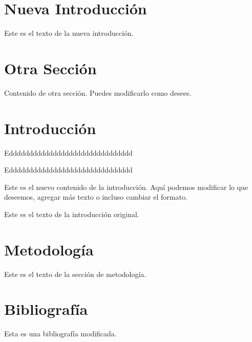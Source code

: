 \documentclass{article}%
\begin{document}
%
\normalsize%
\section{Nueva Introducción}%
\label{sec:NuevaIntroduccin}%
Este es el texto de la nueva introducción.

%
\section{Otra Sección}%
\label{sec:OtraSeccin}%
Contenido de otra sección. Puedes modificarlo como desees.





\section{Introducción}
Eddddddddddddddddddddddddddddddd

Eddddddddddddddddddddddddddddddd

Este es el nuevo contenido de la introducción. Aquí podemos modificar lo que deseemos, 
agregar más texto o incluso cambiar el formato.

Este es el texto de la introducción original.

\section{Metodología}
Este es el texto de la sección de metodología.
%
\section{Bibliografía}%
Esta es una bibliografía modificada.%
\end{document}
